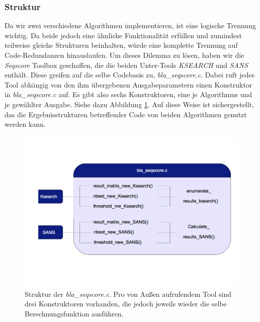 \documentclass{article}
\begin{document}
\subsubsection{Struktur}

Da wir zwei verschiedene Algorithmen implementieren, ist eine logische Trennung wichtig. Da beide jedoch eine ähnliche Funktionalität erfüllen und
zumindest teilweise gleiche Strukturen beinhalten, würde eine komplette Trennung auf Code-Redundanzen hinauslaufen. Um dieses Dilemma zu lösen, haben wir
die \emph{Seqscore} Toolbox geschaffen, die die beiden Unter-Tools \emph{KSEARCH} und \emph{SANS} enthält. Diese greifen auf die selbe Codebasis zu, 
\emph{bla\_seqscore.c}. Dabei ruft jedes Tool abhängig von den ihm übergebenen Ausgabeparametern einen Konstruktor in \emph{bla\_seqscore.c} auf. Es gibt also
sechs Konstruktoren, eine je Algorithmus und je gewählter Ausgabe. Siehe dazu Abbildung \ref{seqsc}. Auf diese Weise ist sichergestellt, das die 
Ergebnisstrukturen betreffender Code von beiden Algorithmen genutzt werden kann.

\begin{center}
  \begin{figure}
    \includegraphics[width = \linewidth]{img/dia2}
    \caption{Struktur der \emph{bla\_seqscore.c}. Pro von Außen aufrufendem Tool sind drei Konstruktoren vorhanden, die jedoch jeweils wieder die
    selbe Berechnungsfunktion ausführen.}
    \label{seqsc}
  \end{figure}
\end{center}
\end{document}
